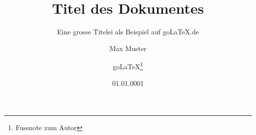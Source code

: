 \documentclass{scrreprt}
\begin{document}
\titlehead{Kopf der Titelei}
\subject{subject: Beispiel}
\title{Titel des Dokumentes}
\subtitle{Eine grosse Titelei als Beispiel auf goLaTeX.de}
\author{Max Muster \and goLaTeX\thanks{Fussnote zum Autor}}
\date{01.01.0001}
\publishers{Betreut und herausgegeben von Prof. Dr. rer. LaTeX}
\extratitle{\centering Schmutztitel \\ goLaTeX (C) 2009 \\ ISBN 978-3865412911}
\uppertitleback{Obiger Titelrückentitel}
\lowertitleback{Für dieses Beispiel wird keine Haftung übernommen.}
\dedication{Dieses Beispiel widme ich\\allen LaTeX Usern}
\maketitle
\end{document}
